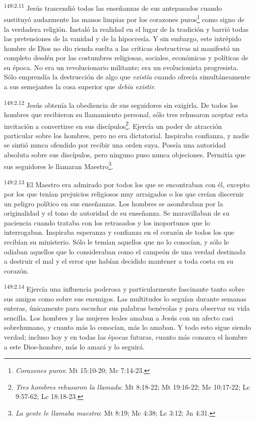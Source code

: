 \par
\textsuperscript{149:2.11} Jesús trascendió todas las enseñanzas de sus antepasados cuando sustituyó audazmente las manos limpias por los corazones puros\footnote{\textit{Corazones puros}: Mt 15:10-20; Mc 7:14-23.} como signo de la verdadera religión. Instaló la realidad en el lugar de la tradición y barrió todas las pretensiones de la vanidad y de la hipocresía. Y sin embargo, este intrépido hombre de Dios no dio rienda suelta a las críticas destructivas ni manifestó un completo desdén por las costumbres religiosas, sociales, económicas y políticas de su época. No era un revolucionario militante; era un evolucionista progresista. Sólo emprendía la destrucción de algo que \textit{existía} cuando ofrecía simultáneamente a sus semejantes la cosa superior que \textit{debía existir}.

\par
\textsuperscript{149:2.12} Jesús obtenía la obediencia de sus seguidores sin exigirla. De todos los hombres que recibieron su llamamiento personal, sólo tres rehusaron aceptar esta invitación a convertirse en sus discípulos\footnote{\textit{Tres hombres rehusaron la llamada}: Mt 8:18-22; Mt 19:16-22; Mc 10:17-22; Lc 9:57-62; Lc 18:18-23.}. Ejercía un poder de atracción particular sobre los hombres, pero no era dictatorial. Inspiraba confianza, y nadie se sintió nunca ofendido por recibir una orden suya. Poseía una autoridad absoluta sobre sus discípulos, pero ninguno puso nunca objeciones. Permitía que sus seguidores le llamaran Maestro\footnote{\textit{La gente le llamaba maestro}: Mt 8:19; Mc 4:38; Lc 3:12; Jn 4:31.}.

\par
\textsuperscript{149:2.13} El Maestro era admirado por todos los que se encontraban con él, excepto por los que tenían prejuicios religiosos muy arraigados o los que creían discernir un peligro político en sus enseñanzas. Los hombres se asombraban por la originalidad y el tono de autoridad de su enseñanza. Se maravillaban de su paciencia cuando trataba con los retrasados y los inoportunos que lo interrogaban. Inspiraba esperanza y confianza en el corazón de todos los que recibían su ministerio. Sólo le temían aquellos que no lo conocían, y sólo le odiaban aquellos que lo consideraban como el campeón de una verdad destinada a destruir el mal y el error que habían decidido mantener a toda costa en su corazón.

\par
\textsuperscript{149:2.14} Ejercía una influencia poderosa y particularmente fascinante tanto sobre sus amigos como sobre sus enemigos. Las multitudes lo seguían durante semanas enteras, únicamente para escuchar sus palabras benévolas y para observar su vida sencilla. Los hombres y las mujeres leales amaban a Jesús con un afecto casi sobrehumano, y cuanto más lo conocían, más lo amaban. Y todo esto sigue siendo verdad; incluso hoy y en todas las épocas futuras, cuanto más conozca el hombre a este Dios-hombre, más lo amará y lo seguirá.

